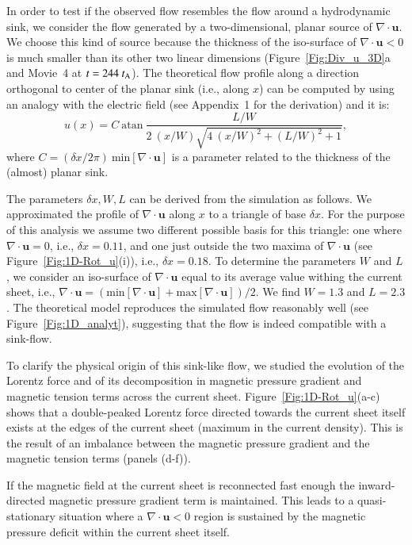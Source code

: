 \documentclass[apj]{emulateapj}
\newcommand{\tA}{t_{\rm A}}
\begin{document}
In order to test if the observed flow resembles the flow around a hydrodynamic sink, we consider the flow generated by a two-dimensional, planar source of $\nabla \cdot \mathbf{u}$. We choose  this kind of source because the thickness of the iso-surface of $\nabla \cdot \mathbf{u}<0$ is much smaller than its other two linear dimensions (Figure~\ref{Fig:Div_u_3D}a and Movie~4 at $t=244~\tA$).  The theoretical flow profile along a direction orthogonal to center of the planar sink (i.e., along $x$) can be computed by using an analogy with the electric field (see Appendix~1 for the derivation) and it is:
\begin{equation}
u(x) = C~\text{atan}~\frac{L/W}{2~(x/W) \sqrt{4~(x/W)^2+(L/W)^2+1}},
\label{Eq_ef3}
\end{equation}
where $C=(\delta x/2\pi)~\text{min}[\nabla \cdot \mathbf{u}]$ is a parameter related to the thickness of the (almost) planar sink. 

The parameters $\delta x, W, L$ can be derived from the simulation as follows. We approximated the profile of $\nabla \cdot \mathbf{u}$ along $x$ to a triangle of base $\delta x$. For the purpose of this analysis we assume two different possible basis for this triangle: one where $\nabla \cdot \mathbf{u}=0$, i.e., $ \delta x =0.11$, and one just outside the two maxima of $\nabla \cdot \mathbf{u}$ (see Figure~\ref{Fig:1D-Rot_u}(i)), i.e., $\delta x=0.18$. To determine the parameters $W$ and $L$, we consider an iso-surface of $\nabla \cdot \mathbf{u}$ equal to its average value withing the current sheet, i.e., $\nabla \cdot \mathbf{u}=(\text{min}[\nabla \cdot \mathbf{u}]+\text{max}[\nabla \cdot \mathbf{u}])/2$. We find $W=1.3$ and $L=2.3$.  
The theoretical model reproduces the simulated flow reasonably well (see Figure~\ref{Fig:1D_analyt}), suggesting that the flow is indeed  compatible with a sink-flow. 

To clarify the physical origin of this sink-like flow, we studied the evolution of the Lorentz force and of its decomposition in magnetic pressure gradient and magnetic tension terms across the current sheet.  Figure~\ref{Fig:1D-Rot_u}(a-c) shows that a double-peaked Lorentz force directed towards the current sheet itself exists at the edges of the current sheet (maximum in the current density). This is the result of an imbalance between the magnetic pressure gradient and  the magnetic tension terms (panels (d-f)).
 
If the magnetic field at the current sheet is reconnected fast enough the inward-directed magnetic pressure gradient term is maintained.  This leads to a quasi-stationary situation where a $\nabla \cdot \mathbf{u}<0$ region is sustained by the magnetic pressure deficit within the current sheet itself.
\end{document}
